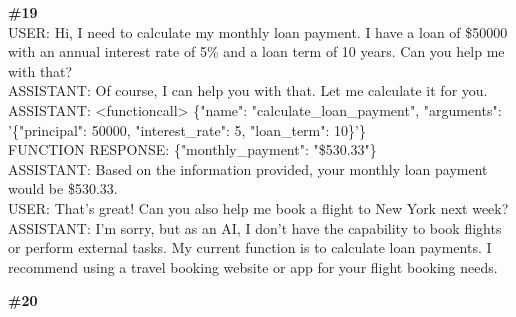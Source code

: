 \documentclass[10pt]{article}
\begin{document}
\begin{Form}
\begin{tcolorbox}[colback=convbg,colframe=itemframe,boxrule=0.8pt,arc=2pt,breakable,left=6pt,right=6pt,top=5pt,bottom=5pt]
\end{tcolorbox}
\vspace{-1pt}
\CheckBox[name=q18c,width=1.6ex,height=1.6ex,bordercolor={0.45 0.45 0.45}]{~\textcolor{cbox}{COMPACT}}\quad
\CheckBox[name=q18d,width=1.6ex,height=1.6ex,bordercolor={0.45 0.45 0.45}]{~\textcolor{dbox}{DIFFUSE}}\quad
\CheckBox[name=q18n,width=1.6ex,height=1.6ex,bordercolor={0.45 0.45 0.45}]{~\textcolor{nbox}{NONE}}
\vspace{8pt}
\begin{tcolorbox}[colback=convbg,colframe=itemframe,boxrule=0.8pt,arc=2pt,breakable,left=6pt,right=6pt,top=5pt,bottom=5pt]
{\footnotesize\textbf{\#19}}\\[3pt]
{\footnotesize USER: Hi, I need to calculate my monthly loan payment. I have a loan of \$50000 with an annual interest rate of 5\% and a loan term of 10 years. Can you help me with that? \\[2pt]
ASSISTANT: Of course, I can help you with that. Let me calculate it for you.   \\[2pt]
ASSISTANT: <functioncall> \{"name": "calculate\_loan\_payment", "arguments": '\{"principal": 50000, "interest\_rate": 5, "loan\_term": 10\}'\}   \\[2pt]
FUNCTION RESPONSE: \{"monthly\_payment": "\$530.33"\} \\[2pt]
ASSISTANT: Based on the information provided, your monthly loan payment would be \$530.33.   \\[2pt]
USER: That's great! Can you also help me book a flight to New York next week? \\[2pt]
ASSISTANT: I'm sorry, but as an AI, I don't have the capability to book flights or perform external tasks. My current function is to calculate loan payments. I recommend using a travel booking website or app for your flight booking needs.  }
\end{tcolorbox}
\vspace{-1pt}
\CheckBox[name=q19c,width=1.6ex,height=1.6ex,bordercolor={0.45 0.45 0.45}]{~\textcolor{cbox}{COMPACT}}\quad
\CheckBox[name=q19d,width=1.6ex,height=1.6ex,bordercolor={0.45 0.45 0.45}]{~\textcolor{dbox}{DIFFUSE}}\quad
\CheckBox[name=q19n,width=1.6ex,height=1.6ex,bordercolor={0.45 0.45 0.45}]{~\textcolor{nbox}{NONE}}
\vspace{8pt}
\begin{tcolorbox}[colback=convbg,colframe=itemframe,boxrule=0.8pt,arc=2pt,breakable,left=6pt,right=6pt,top=5pt,bottom=5pt]
{\footnotesize\textbf{\#20}}\\[3pt]

\end{tcolorbox}
\end{Form}
\end{document}
